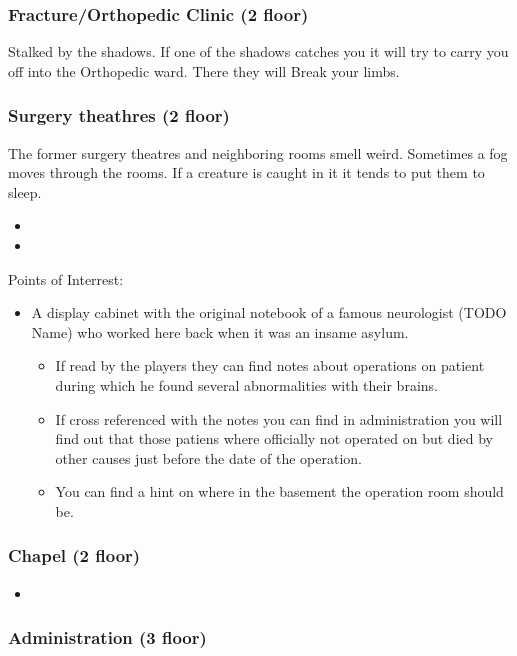 \documentclass[11pt]{article}
\begin{document}
{\subsubsection{Fracture/Orthopedic Clinic (2 floor)}
\label{sec:orgf631ee2}

Stalked by the shadows. If one of the shadows catches you it will try to carry you off into the Orthopedic ward. There they will Break your limbs.
\subsubsection{Surgery theathres (2 floor)}
\label{sec:org0f80a13}
The former surgery theatres and neighboring rooms smell weird. Sometimes a fog moves through the rooms. If a creature is caught in it it tends to put them to sleep.

\begin{itemize}
\item {}
\item {}
\end{itemize}

Points of Interrest:
\begin{itemize}
\item A display cabinet with the original notebook of a famous neurologist (TODO Name) who worked here back when it was an insame asylum.
\begin{itemize}
\item If read by the players they can find notes about operations on patient during which he found several abnormalities with their brains.
\item If cross referenced with the notes you can find in administration you will find out that those patiens where officially not operated on but died by other causes just before the date of the operation.
\item You can find a hint on where in the basement the operation room should be.
\end{itemize}
\end{itemize}
\subsubsection{Chapel (2 floor)}
\label{sec:orgbf94dd9}

\begin{itemize}
\item {}
\end{itemize}
\subsubsection{Administration (3 floor)}
\label{sec:orgb302ad3}

}
\end{document}
